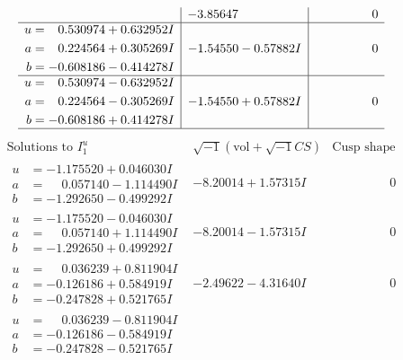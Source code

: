 \documentclass[1p]{elsarticle_modified}
\theoremstyle{definition}
\newcommand{\I}{\sqrt{-1}}
\begin{document}
$$\begin{array}{c|c|c}
 & -3.85647\phantom{ +0.000000I} & \phantom{-0.000000 } 0 \\ \hline\begin{aligned}
u &= \phantom{-}0.530974 + 0.632952 I \\
a &= \phantom{-}0.224564 + 0.305269 I \\
b &= -0.608186 - 0.414278 I\end{aligned}
 & -1.54550 - 0.57882 I & \phantom{-0.000000 } 0 \\ \hline\begin{aligned}
u &= \phantom{-}0.530974 - 0.632952 I \\
a &= \phantom{-}0.224564 - 0.305269 I \\
b &= -0.608186 + 0.414278 I\end{aligned}
 & -1.54550 + 0.57882 I & \phantom{-0.000000 } 0\\
 \hline 
 \end{array}$$\newpage$$\begin{array}{c|c|c}  
\text{Solutions to }I^u_{1}& \I (\text{vol} + \sqrt{-1}CS) & \text{Cusp shape}\\
 \hline 
\begin{aligned}
u &= -1.175520 + 0.046030 I \\
a &= \phantom{-}0.057140 - 1.114490 I \\
b &= -1.292650 - 0.499292 I\end{aligned}
 & -8.20014 + 1.57315 I & \phantom{-0.000000 } 0 \\ \hline\begin{aligned}
u &= -1.175520 - 0.046030 I \\
a &= \phantom{-}0.057140 + 1.114490 I \\
b &= -1.292650 + 0.499292 I\end{aligned}
 & -8.20014 - 1.57315 I & \phantom{-0.000000 } 0 \\ \hline\begin{aligned}
u &= \phantom{-}0.036239 + 0.811904 I \\
a &= -0.126186 + 0.584919 I \\
b &= -0.247828 + 0.521765 I\end{aligned}
 & -2.49622 - 4.31640 I & \phantom{-0.000000 } 0 \\ \hline\begin{aligned}
u &= \phantom{-}0.036239 - 0.811904 I \\
a &= -0.126186 - 0.584919 I \\
b &= -0.247828 - 0.521765 I\end{aligned}

\end{array}$$
\end{document}
